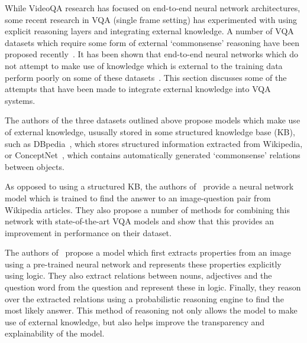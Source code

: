\documentclass[../interim.tex]{subfiles}
\begin{document}
While VideoQA research has focused on end-to-end neural network architectures, some recent research in VQA (single frame setting) has experimented with using explicit reasoning layers and integrating external knowledge. A number of VQA datasets which require some form of external `commonsense' reasoning have been proposed recently~\cite{dataset:ok-vqa, dataset:fvqa, dataset:kb-vqa}. It has been shown that end-to-end neural networks which do not attempt to make use of knowledge which is external to the training data perform poorly on some of these datasets~\cite{dataset:ok-vqa}. This section discusses some of the attempts that have been made to integrate external knowledge into VQA systems.

The authors of the three datasets outlined above propose models which make use of external knowledge, ususally stored in some structured knowledge base (KB), such as DBpedia~\cite{kb:dbpedia}, which stores structured information extracted from Wikipedia, or ConceptNet~\cite{kb:conceptnet}, which contains automatically generated `commonsense' relations between objects.

As opposed to using a structured KB, the authors of~\cite{dataset:ok-vqa} provide a neural network model which is trained to find the answer to an image-question pair from Wikipedia articles. They also propose a number of methods for combining this network with state-of-the-art VQA models and show that this provides an improvement in performance on their dataset.

The authors of~\cite{explicit-reasoning-vqa} propose a model which first extracts properties from an image using a pre-trained neural network and represents these properties explicitly using logic. They also extract relations between nouns, adjectives and the question word from the question and represent these in logic. Finally, they reason over the extracted relations using a probabilistic reasoning engine to find the most likely answer. This method of reasoning not only allows the model to make use of external knowledge, but also helps improve the transparency and explainability of the model.
\end{document}
